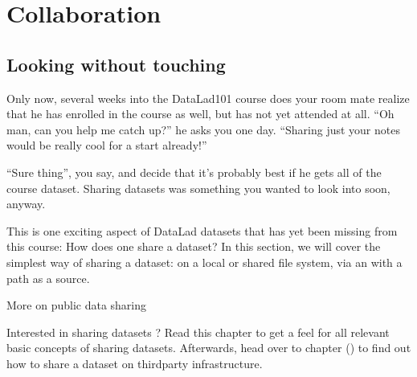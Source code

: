 \chapter{Collaboration}
\label{\detokenize{basics/basics-collaboration:collaboration}}\label{\detokenize{basics/basics-collaboration:chapter-collaboration}}\label{\detokenize{basics/basics-collaboration::doc}}

\sphinxstepscope

\ignorespaces 

\section{Looking without touching}
\label{\detokenize{basics/101-116-sharelocal:looking-without-touching}}\label{\detokenize{basics/101-116-sharelocal:sharelocal1}}\label{\detokenize{basics/101-116-sharelocal:index-0}}\label{\detokenize{basics/101-116-sharelocal::doc}}
\sphinxAtStartPar
Only now, several weeks into the DataLad\sphinxhyphen{}101 course does your room
mate realize that he has enrolled in the course as well, but has not
yet attended at all. “Oh man, can you help me catch up?” he asks
you one day. “Sharing just your notes would be really cool for a
start already!”

\sphinxAtStartPar
“Sure thing”, you say, and decide that it’s probably best if he gets
all of the  course dataset. Sharing datasets was
something you wanted to look into soon, anyway.

\sphinxAtStartPar
This is one exciting aspect of DataLad datasets that has yet been missing
from this course: How does one share a dataset?
In this section, we will cover the simplest way of sharing a dataset:
on a local or shared file system, via an  with a path as
a source.
\begin{importantnote}[before title={\thetcbcounter\ }, check odd page=true]{More on public data sharing}

\sphinxAtStartPar
Interested in sharing datasets ? Read this chapter to get a feel
for all relevant basic concepts of sharing datasets. Afterwards, head over
to chapter {\hyperref[\detokenize{basics/basics-thirdparty:chapter-thirdparty}]{}} () to find out how to share a dataset
on third\sphinxhyphen{}party infrastructure.


\end{importantnote}


